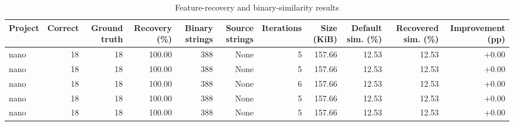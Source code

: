 \begin{table}[htbp]
\centering
\caption{Feature-recovery and binary-similarity results}
\label{tab:feature-recovery-results}
\small
\begin{tabular}{lrrrrrrrrrr}
\toprule
Project & Correct & Ground truth & Recovery (\%) & Binary strings & Source strings & Iterations & Size (KiB) & Default sim. (\%) & Recovered sim. (\%) & Improvement (pp) \\
\midrule
nano & 18 & 18 & 100.00 & 388 & None & 5 & 157.66 & 12.53 & 12.53 & +0.00 \\
nano & 18 & 18 & 100.00 & 388 & None & 5 & 157.66 & 12.53 & 12.53 & +0.00 \\
nano & 18 & 18 & 100.00 & 388 & None & 6 & 157.66 & 12.53 & 12.53 & +0.00 \\
nano & 18 & 18 & 100.00 & 388 & None & 5 & 157.66 & 12.53 & 12.53 & +0.00 \\
nano & 18 & 18 & 100.00 & 388 & None & 5 & 157.66 & 12.53 & 12.53 & +0.00 \\
\bottomrule
\end{tabular}
\end{table}
